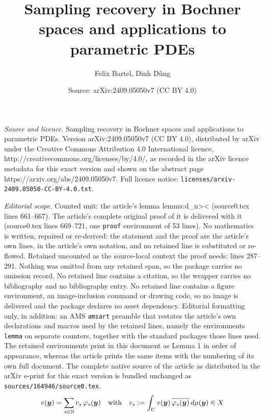 \documentclass[10pt,a4paper]{amsart}
\title{\sffamily Sampling recovery in Bochner spaces and applications to \\ parametric PDEs}
\author{Felix Bartel, Dinh D\~ung}
\date{Source: arXiv:2409.05050v7 (CC BY 4.0)}
\def\NN{{\mathbb N}}
\newcommand{\by}{{\boldsymbol{y}}}
\newcommand{\rd}{{\rm d}}
\begin{document}
\maketitle

\noindent\emph{Source and licence.} \sffamily Sampling recovery in Bochner spaces and applications to \\ parametric PDEs. Version arXiv:2409.05050v7 (CC BY 4.0), distributed by arXiv under the Creative Commons Attribution 4.0 International licence, http://creativecommons.org/licenses/by/4.0/, as recorded in the arXiv licence metadata for this exact version and shown on the abstract page https://arxiv.org/abs/2409.05050v7. Full licence notice: \texttt{licenses/arxiv-2409.05050-CC-BY-4.0.txt}.\par\smallskip

\noindent\textit{Editorial scope.} Counted unit: the article's lemma lemma:d\_n>< (source0.tex lines 661--667). The article's complete original proof of it is delivered with it (source0.tex lines 669--721, one \texttt{proof} environment of 53 lines). No mathematics is written, repaired or re-derived: the statement and the proof are the article's own lines, in the article's own notation, and no retained line is substituted or re-flowed.  Retained uncounted as the source-local context the proof needs: lines 287--291.  Nothing was omitted from any retained span, so the package carries no omission record.  No retained line contains a citation, so the wrapper carries no bibliography and no bibliography entry.  No retained line contains a figure environment, an image-inclusion command or drawing code, so no image is delivered and the package declares no asset dependency.  Editorial formatting only, in addition: an AMS \texttt{amsart} preamble that restates the article's own declarations and macros used by the retained lines, namely the environments \texttt{lemma} on separate counters, together with the standard packages those lines need.  The retained environments print in this document as Lemma 1 in order of appearance, whereas the article prints the same items with the numbering of its own full document.  The complete native source of the article as distributed in the arXiv e-print for this exact version is bundled unchanged as \texttt{sources/164946/source0.tex}.
\begin{equation} \label{series}
	v(\by)=\sum_{s \in \NN} v_s \,\varphi_s(\by)
 \quad\text{with}\quad
	v_s:=\int_U v(\by)\,\overline{\varphi_s(\by)}\, \rd\mu (\by) \in X
\end{equation}
\end{document}
